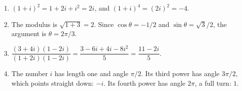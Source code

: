 \begin{workedexample}[Answers]
\begin{enumerate}
  \item $(1 + i)^2 = 1 + 2i + i^2 = 2i$, and $(1 + i)^4 = (2i)^2 = -4$.
  \item The modulus is $\sqrt{1 + 3} = 2$. Since $\cos\theta = -1/2$ and $\sin\theta = \sqrt{3}/2$, the argument is $\theta = 2\pi/3$.
  \item $\dfrac{(3 + 4i)(1 - 2i)}{(1 + 2i)(1 - 2i)} = \dfrac{3 - 6i + 4i - 8i^2}{5} = \dfrac{11 - 2i}{5}$.
  \item The number $i$ has length one and angle $\pi/2$. Its third power has angle $3\pi/2$, which points straight down: $-i$. Its fourth power has angle $2\pi$, a full turn: $1$.
\end{enumerate}
\end{workedexample}
